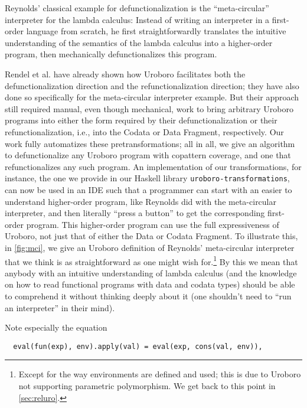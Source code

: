 Reynolds' classical example for defunctionalization is the ``meta-circular'' interpreter for the lambda calculus: Instead of writing an interpreter in a first-order language from scratch, he first straightforwardly translates the intuitive understanding of the semantics of the lambda calculus into a higher-order program, then mechanically defunctionalizes this program.

Rendel et al.\cite{rendel15automatic} have already shown how Uroboro facilitates both the defunctionalization direction and the refunctionalization direction; they have also done so specifically for the meta-circular interpreter example. But their approach still required manual, even though mechanical, work to bring arbitrary Uroboro programs into either the form required by their defunctionalization or their refunctionalization, i.e., into the Codata or Data Fragment, respectively. Our work fully automatizes these pretransformations; all in all, we give an algorithm to defunctionalize any Uroboro program with copattern coverage, and one that refunctionalizes any such program. An implementation of our transformations, for instance, the one we provide in our Haskell library \texttt{uroboro-transformations}, can now be used in an IDE such that a programmer can start with an easier to understand higher-order program, like Reynolds\cite{reynolds72definitional} did with the meta-circular interpreter, and then literally ``press a button'' to get the corresponding first-order program. This higher-order program can use the full expressiveness of Uroboro, not just that of either the Data or Codata Fragment. To illustrate this, in \autoref{fig:mci}, we give an Uroboro definition of Reynolds' meta-circular interpreter that we think is as straightforward as one might wish for.\footnote{Except for the way environments are defined and used; this is due to Uroboro not supporting parametric polymorphism. We get back to this point in \autoref{sec:reluro}.} By this we mean that anybody with an intuitive understanding of lambda calculus (and the knowledge on how to read functional programs with data and codata types) should be able to comprehend it without thinking deeply about it (one shouldn't need to ``run an interpreter'' in their mind).

Note especially the equation

\begin{lstlisting}
  eval(fun(exp), env).apply(val) = eval(exp, cons(val, env)),
\end{lstlisting}

